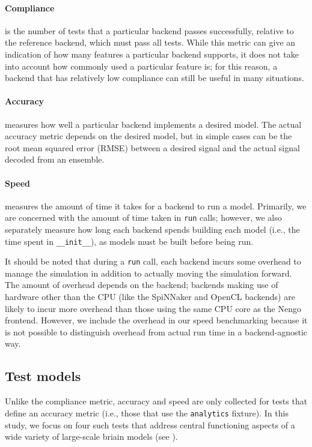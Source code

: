 \documentclass{frontiersSCNS}
\begin{document}
\paragraph{Compliance}
is the number of tests that a particular backend
passes successfully, relative to the reference
backend, which must pass all tests.
While this metric can give an indication
of how many features a particular backend supports,
it does not take into account how commonly used
a particular feature is;
for this reason, a backend that has relatively
low compliance can still be useful
in many situations.

\paragraph{Accuracy}
measures how well a particular backend
implements a desired model.
The actual accuracy metric depends
on the desired model,
but in simple cases can be
the root mean squared error (RMSE)
between a desired signal
and the actual signal decoded
from an ensemble.

\paragraph{Speed}
measures the amount of time it takes
for a backend to run a model.
Primarily, we are concerned with
the amount of time taken
in \texttt{run} calls;
however, we also separately measure how long
each backend spends building each model
(i.e., the time spent in \texttt{\_\_init\_\_}),
as models must be built before being run.

It should be noted that
during a \texttt{run} call,
each backend incurs some overhead
to manage the simulation in addition
to actually moving the simulation forward.
The amount of overhead depends
on the backend; backends making use
of hardware other than the CPU
(like the SpiNNaker and OpenCL backends)
are likely to incur more overhead
than those using the same CPU core
as the Nengo frontend.
However, we include the overhead in
our speed benchmarking because
it is not possible to distinguish
overhead from actual run time
in a backend-agnostic way.

\subsection{Test models}

Unlike the compliance metric,
accuracy and speed are only collected
for tests that define an accuracy metric
(i.e., those that use the \texttt{analytics} fixture).
In this study, we focus on four such tests
that address central functioning aspects
of a wide variety of large-scale briain models
(see \citealp{eliasmith2003a,eliasmith2013}).
\end{document}
